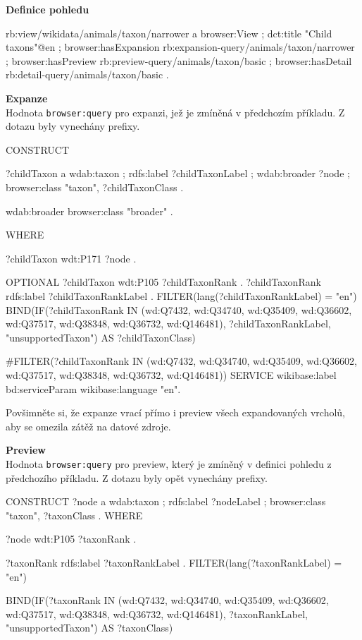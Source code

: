 \begin{prikl}
\medskip

\textbf{Definice pohledu}
\begin{code}
rb:view/wikidata/animals/taxon/narrower a browser:View ;
    dct:title "Child taxons"@en ;
    browser:hasExpansion rb:expansion-query/animals/taxon/narrower ;
    browser:hasPreview rb:preview-query/animals/taxon/basic ;
    browser:hasDetail rb:detail-query/animals/taxon/basic .
\end{code}

\textbf{Expanze} \\
Hodnota \texttt{browser:query} pro expanzi, jež je zmíněná v předchozím příkladu. Z dotazu byly vynechány prefixy.
\begin{code}
CONSTRUCT {
    ?childTaxon a wdab:taxon ;
                rdfs:label ?childTaxonLabel ;
                wdab:broader ?node ;
                browser:class "taxon",
                              ?childTaxonClass .

    wdab:broader browser:class "broader" .
} WHERE {
    ?childTaxon wdt:P171 ?node .

    OPTIONAL {
        ?childTaxon wdt:P105 ?childTaxonRank .
        ?childTaxonRank rdfs:label ?childTaxonRankLabel .
        FILTER(lang(?childTaxonRankLabel) = "en")
        BIND(IF(?childTaxonRank IN (wd:Q7432, wd:Q34740, wd:Q35409,
            wd:Q36602, wd:Q37517, wd:Q38348, wd:Q36732, wd:Q146481),
            ?childTaxonRankLabel, "unsupportedTaxon") AS
            ?childTaxonClass)
    }

    #FILTER(?childTaxonRank IN (wd:Q7432, wd:Q34740, wd:Q35409,
    wd:Q36602, wd:Q37517, wd:Q38348, wd:Q36732, wd:Q146481))
    SERVICE wikibase:label { bd:serviceParam wikibase:language "en". }
}
\end{code}
Povšimněte si, že expanze vrací přímo i preview všech expandovaných vrcholů, aby se omezila zátěž na datové zdroje.
\medskip

\textbf{Preview} \\
Hodnota \texttt{browser:query} pro preview, který je zmíněný v definici pohledu z předchozího příkladu. Z dotazu byly opět vynechány prefixy.
\begin{code}
CONSTRUCT {
    ?node a wdab:taxon ;
          rdfs:label ?nodeLabel ;
          browser:class "taxon",
                        ?taxonClass .
} WHERE {
    ?node wdt:P105 ?taxonRank .

    ?taxonRank rdfs:label ?taxonRankLabel .
    FILTER(lang(?taxonRankLabel) = "en")

    BIND(IF(?taxonRank IN (wd:Q7432, wd:Q34740, wd:Q35409, wd:Q36602,
        wd:Q37517, wd:Q38348, wd:Q36732, wd:Q146481), ?taxonRankLabel,
        "unsupportedTaxon") AS ?taxonClass)

}
\end{code}
\end{prikl}
